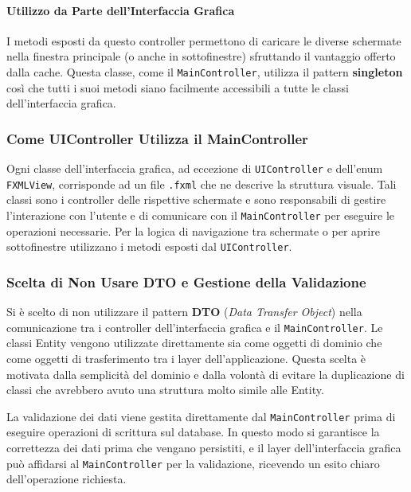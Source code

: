\documentclass[12pt,a4paper]{article}
\begin{document}
\paragraph{Utilizzo da Parte dell'Interfaccia Grafica}

I metodi esposti da questo controller permettono di caricare le diverse schermate nella
finestra principale (o anche in sottofinestre) sfruttando il vantaggio offerto dalla cache.
Questa classe, come il \texttt{MainController}, utilizza il pattern \textbf{singleton} così
che tutti i suoi metodi siano facilmente accessibili a tutte le classi dell'interfaccia
grafica.

\subsubsection{Come UIController Utilizza il MainController}

Ogni classe dell'interfaccia grafica, ad eccezione di \texttt{UIController} e dell'enum
\texttt{FXMLView}, corrisponde ad un file \texttt{.fxml} che ne descrive la struttura
visuale. Tali classi sono i controller delle rispettive schermate e sono responsabili di
gestire l'interazione con l'utente e di comunicare con il \texttt{MainController} per
eseguire le operazioni necessarie. Per la logica di navigazione tra schermate o per aprire
sottofinestre utilizzano i metodi esposti dal \texttt{UIController}.

\subsubsection{Scelta di Non Usare DTO e Gestione della Validazione}

Si è scelto di non utilizzare il pattern \textbf{DTO} (\textit{Data Transfer Object}) nella
comunicazione tra i controller dell'interfaccia grafica e il \texttt{MainController}. Le
classi Entity vengono utilizzate direttamente sia come oggetti di dominio che come oggetti
di trasferimento tra i layer dell'applicazione. Questa scelta è motivata dalla semplicità
del dominio e dalla volontà di evitare la duplicazione di classi che avrebbero avuto una
struttura molto simile alle Entity.

La validazione dei dati viene gestita direttamente dal \texttt{MainController} prima di
eseguire operazioni di scrittura sul database. In questo modo si garantisce la correttezza
dei dati prima che vengano persistiti, e il layer dell'interfaccia grafica può affidarsi al
\texttt{MainController} per la validazione, ricevendo un esito chiaro dell'operazione
richiesta.
\end{document}
